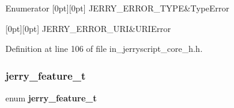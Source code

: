 \begin{DoxyEnumFields}{Enumerator}
[0pt][0pt]{}\mbox{\label{group___core_gga223d3cab9ac7326d5c0f10c671ae4629a28395737b54ed5a74f135ef2eddf0978}} 
J\+E\+R\+R\+Y\+\_\+\+E\+R\+R\+O\+R\+\_\+\+T\+Y\+PE&Type\+Error \\
\hline

[0pt][0pt]{}\mbox{\label{group___core_gga223d3cab9ac7326d5c0f10c671ae4629a87d817b7d9cb8a1f1b58f87d98ca3821}} 
J\+E\+R\+R\+Y\+\_\+\+E\+R\+R\+O\+R\+\_\+\+U\+RI&U\+R\+I\+Error \\
\hline

\end{DoxyEnumFields}


Definition at line 106 of file in\+\_\+jerryscript\+\_\+core\+\_\+h.\+h.

\mbox{\label{group___core_gab25dc3f353c04e0b0348008be3c13b79}} 
\subsubsection{jerry\_feature\_t}
{\footnotesize\ttfamily enum \textbf{ jerry\+\_\+feature\+\_\+t}}

